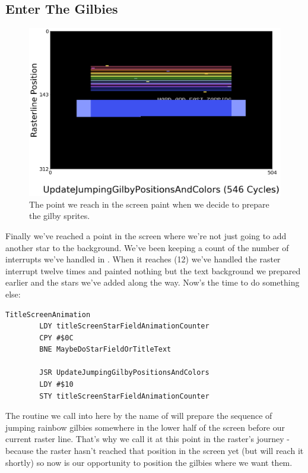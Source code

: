 \subsection{Enter The Gilbies}
\begin{figure}[H]
    \centering
      \includegraphics[width=12cm]{titlescreen/title25.png}%
\caption{The point we reach in the screen paint when we decide to prepare the gilby sprites.}
\end{figure}

Finally we've reached a point in the screen where we're not just going to add another star to the background.
We've been keeping a count of the number of interrupts we've handled in .
When it reaches  (12) we've handled the raster interrupt twelve times and painted nothing but the
text background we prepared earlier and the stars we've added along the way. Now's the time to do something else:

\begin{lstlisting}
TitleScreenAnimation
        LDY titleScreenStarFieldAnimationCounter
        CPY #$0C
        BNE MaybeDoStarFieldOrTitleText

        JSR UpdateJumpingGilbyPositionsAndColors
        LDY #$10
        STY titleScreenStarFieldAnimationCounter
\end{lstlisting}

The routine we call into here by the name of  will prepare the sequence
of jumping rainbow gilbies somewhere in the lower half of the screen before our current raster line. That's why we
call it at this point in the raster's journey - because the raster hasn't reached that position in the screen yet
(but will reach it shortly) so now is our opportunity to position the gilbies where we want them. 

